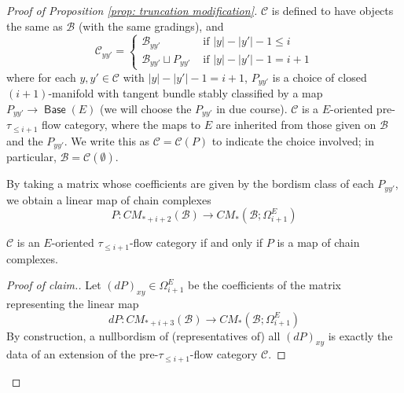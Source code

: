 \documentclass{TPmod}
\DeclareMathOperator{\Base}{\mathsf{Base}}
\newcommand{\cB}{\mathcal{B}}
\newcommand{\cC}{\mathcal{C}}
\numberwithin{equation}{section}
\begin{document}
    \begin{proof}[Proof of Proposition \ref{prop: truncation modification}]
        $\cC$ is defined to have objects the same as $\cB$ (with the same gradings), and
        \begin{equation}
            \cC_{yy'} = \begin{cases}
                \cB_{yy'} 
                &
                \textrm{ if } |y|-|y'|-1 \leq i
                \\
                \cB_{yy'} \sqcup P_{yy'}
                &
                \textrm{ if } |y|-|y'|-1 = i+1
            \end{cases}
        \end{equation}
        where for each $y, y' \in \cC$ with $|y|-|y'|-1 = i+1$, $P_{yy'}$ is a choice of closed $(i+1)$-manifold with tangent bundle stably classified by a map $P_{yy'} \to \Base(E)$ (we will choose the $P_{yy'}$ in due course). $\cC$ is a $E$-oriented pre-$\tau_{\leq i+1}$ flow category, where the maps to $E$ are inherited from those given on $\cB$ and the $P_{yy'}$. We write this as $\cC=\cC(P)$ to indicate the choice involved; in particular, $\cB = \cC(\emptyset)$.

        By taking a matrix whose coefficients are given by the bordism class of each $P_{yy'}$, we obtain a linear map of chain complexes
        \begin{equation}
            P: CM_{*+i+2}(\cB) \to CM_*(\cB; \Omega_{i+1}^{E})
        \end{equation}
        

        \begin{claim}
            $\cC$ is an $E$-oriented $\tau_{\leq i+1}$-flow category if and only if $P$ is a map of chain complexes.
        \end{claim}
        \begin{proof}[Proof of claim.]

            Let $(dP)_{xy} \in \Omega^{E}_{i+1}$ be the coefficients of the matrix representing the linear map
            \begin{equation}
                dP: CM_{*+i+3}(\cB) \to CM_*\left(\cB; \Omega_{i+1}^{E}\right)
            \end{equation}
            By construction, a nullbordism of (representatives of) all $(dP)_{xy}$ is exactly the data of an extension of the pre-$\tau_{\leq i+1}$-flow category $\cC$.
        \end{proof}


\end{proof}
\end{document}

